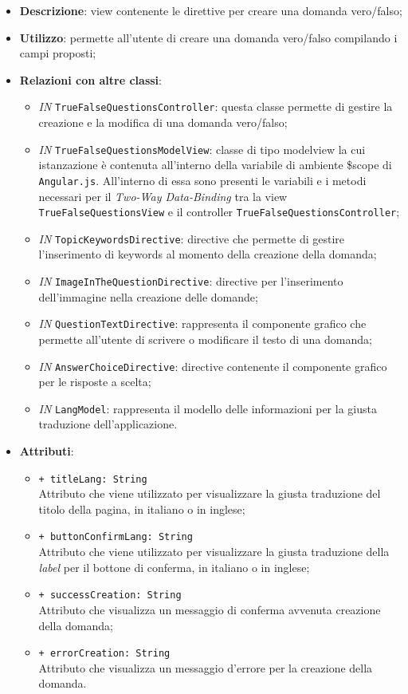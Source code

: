 \begin{itemize}
	\item \textbf{Descrizione}: view contenente le direttive per creare una domanda vero/falso; 
	\item \textbf{Utilizzo}: permette all'utente di creare una domanda vero/falso compilando i campi proposti;
	\item \textbf{Relazioni con altre classi}:
	\begin{itemize}
		\item \textit{IN} \texttt{TrueFalseQuestionsController}: questa classe permette di gestire la creazione e la modifica di una domanda vero/falso;
		\item \textit{IN} \texttt{TrueFalseQuestionsModelView}: classe di tipo modelview la cui istanzazione è contenuta all'interno della variabile di ambiente \$scope di \texttt{Angular.js}. All'interno di essa sono presenti le variabili e i metodi necessari per il \textit{Two-Way Data-Binding} tra la view \texttt{TrueFalseQuestionsView} e il controller \texttt{TrueFalseQuestionsController};
		\item \textit{IN} \texttt{TopicKeywordsDirective}: directive che permette di gestire l'inserimento di keywords al momento della creazione della domanda;
		\item \textit{IN} \texttt{ImageInTheQuestionDirective}: directive per l'inserimento dell'immagine nella creazione delle domande;
		\item \textit{IN} \texttt{QuestionTextDirective}: rappresenta il componente grafico che permette all'utente di scrivere o modificare il testo di una domanda;
		\item \textit{IN} \texttt{AnswerChoiceDirective}: directive contenente il componente grafico per le risposte a scelta;  
		\item \textit{IN} \texttt{LangModel}: rappresenta il modello delle informazioni per la giusta traduzione dell'applicazione.
	\end{itemize}
\item \textbf{Attributi}:
	\begin{itemize}
		\item \texttt{+ titleLang: String} \\ Attributo che viene utilizzato per visualizzare la giusta traduzione del titolo della pagina, in italiano o in inglese;
		\item \texttt{+ buttonConfirmLang: String} \\ Attributo che viene utilizzato per visualizzare la giusta traduzione della \textit{label} per il bottone di conferma, in italiano o in inglese;
		\item \texttt{+ successCreation: String} \\ Attributo che visualizza un messaggio di conferma avvenuta creazione della domanda;
		\item \texttt{+ errorCreation: String} \\ Attributo che visualizza un messaggio d'errore per la creazione della domanda.
	\end{itemize}
\end{itemize}


